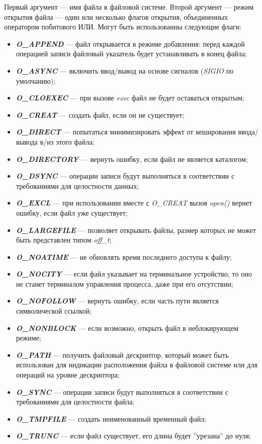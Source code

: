 Первый аргумент --- имя файла в файловой системе.
Второй аргумент --- режим открытия файла --- один или несколько флагов открытия, объединенных оператором побитового ИЛИ.
Могут быть использованны следующие флаги:
\begin{itemize}
	\item \textit{\textbf{O\_APPEND}} --- файл открывается в режиме добавления: перед каждой операцией записи файловый указатель будет устанавливать в конец файла;
	\item \textit{\textbf{O\_ASYNC}} --- включить ввод/вывод на основе сигналов (\textit{SIGIO} по умолчанию);
	\item \textit{\textbf{O\_CLOEXEC}} --- при вызове \textit{exec} файл не будет оставаться открытым;
	\item \textit{\textbf{O\_CREAT}} --- создать файл, если он не существует;
	\item \textit{\textbf{O\_DIRECT}} --- попытаться минимизировать эффект от кеширования ввода/вывода в/из этого файла;
	\item \textit{\textbf{O\_DIRECTORY}} --- вернуть ошибку, если файл не является каталогом;
	\item \textit{\textbf{O\_DSYNC}} --- операции записи будут выполняться в соответствии с требованиями для целостности данных;
	\item \textit{\textbf{O\_EXCL}} --- при использовании вместе с \textit{O\_CREAT} вызов \textit{open()} вернет ошибку, если файл уже существует;
	\item \textit{\textbf{O\_LARGEFILE}} --- позволяет открывать файлы, размер которых не может быть представлен типом \textit{off\_t};
	\item \textit{\textbf{O\_NOATIME}} --- не обновлять время последнего доступа к файлу;
	\item \textit{\textbf{O\_NOCITY}} --- если файл указывает на терминальное устройство, то оно не станет терминалом управления процесса, даже при его отсутствии;
	\item \textit{\textbf{O\_NOFOLLOW}} --- вернуть ошибку, если часть пути является символической ссылкой;
	\item \textit{\textbf{O\_NONBLOCK}} --- если возможно, открыть файл в неблокирующем режиме;
	\item \textit{\textbf{O\_PATH}} --- получить файловый дескриптор, который может быть использован для индикации расположения файла в файловой системе или для операций на уровне дескриптора;
	\item \textit{\textbf{O\_SYNC}} --- операции записи будут выполняться в соответствии с требованиями для целостности файла;
	\item \textit{\textbf{O\_TMPFILE}} --- создать неименованный временный файл;
	\item \textit{\textbf{O\_TRUNC}} --- если файл существует, его длина будет ''урезана'' до нуля;
\end{itemize}

